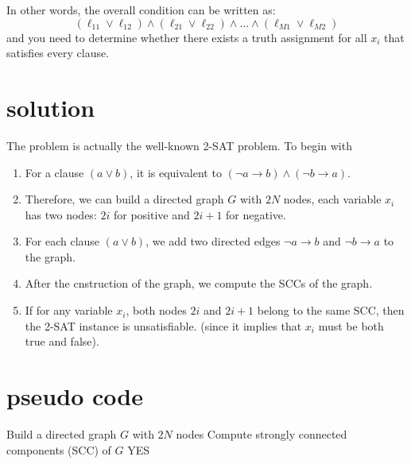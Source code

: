 \documentclass[a4paper,12pt]{article}
\begin{document}
\noindent
In other words, the overall condition can be written as:
\[
(\ell_{11} \lor \ell_{12}) \land (\ell_{21} \lor \ell_{22}) \land \dots \land (\ell_{M1} \lor \ell_{M2})
\]
and you need to determine whether there exists a truth assignment for all $x_i$ that satisfies every clause.

\section{solution}
The problem is actually the well-known 2-SAT problem. To begin with
\begin{enumerate}
    \item For a clause $(a \lor b)$, it is equivalent to $(\neg a \rightarrow b) \land (\neg b \rightarrow a)$.
    \item Therefore, we can build a directed graph $G$ with $2N$ nodes, each variable $x_i$ has two nodes: $2i$ for positive and $2i+1$ for negative.
    \item For each clause $(a \lor b)$, we add two directed edges $\neg a \rightarrow b$ and $\neg b \rightarrow a$ to the graph.
    \item After the cnstruction of the graph, we compute the SCCs of the graph.
    \item If for any variable $x_i$, both nodes $2i$ and $2i+1$ belong to the same SCC, then the 2-SAT instance is unsatisfiable.
    (since it implies that $x_i$ must be both true and false).
\end{enumerate}
\section{pseudo code}
\begin{algorithm}[H]
\SetAlgoLined
{}

Build a directed graph $G$ with $2N$ nodes\;
Compute strongly connected components (SCC) of $G$\;
\Return YES\;
\caption{2-SAT satisfiability checking}
\end{algorithm}
\end{document}
